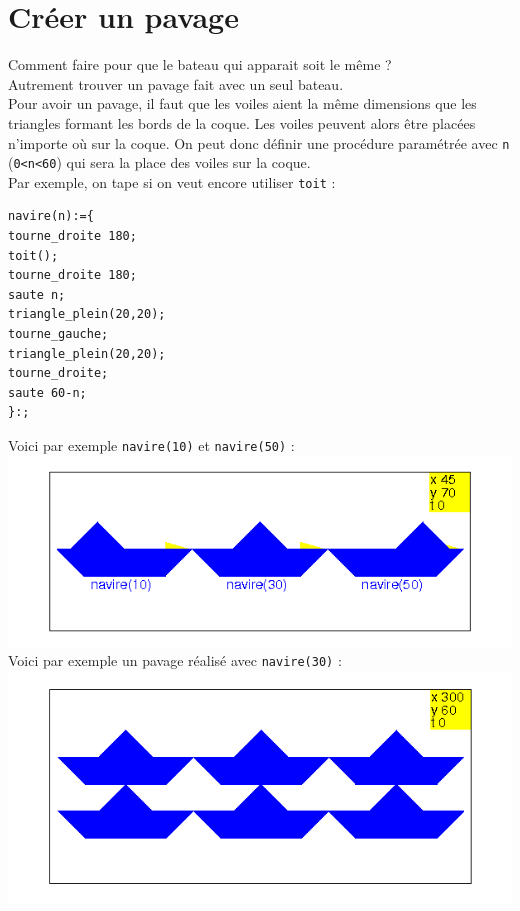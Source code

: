 \documentclass[a4paper,11pt]{book}
\begin{document}
\section{Cr\'eer un pavage}
Comment faire pour que le bateau qui apparait soit le m\^eme ?\\
Autrement trouver un pavage fait avec un seul bateau.\\
Pour avoir un pavage, il faut que les voiles aient la m\^eme 
dimensions que les triangles formant les bords de la coque. Les voiles peuvent 
alors \^etre plac\'ees n'importe o\`u sur la coque. 
On peut donc d\'efinir une proc\'edure param\'etr\'ee avec {\tt n} 
({\tt 0<n<60}) qui sera la place des voiles sur la coque.\\
Par exemple, on tape si on veut encore utiliser {\tt toit} :
\begin{verbatim} 
navire(n):={
tourne_droite 180;
toit();
tourne_droite 180;
saute n;
triangle_plein(20,20);
tourne_gauche;
triangle_plein(20,20);
tourne_droite;
saute 60-n;
}:;
\end{verbatim}
Voici par exemple {\tt navire(10)} et {\tt navire(50)} :\\
%
\includegraphics[width=\textwidth]{tortnavs}\\
Voici par exemple un pavage r\'ealis\'e avec {\tt navire(30)} :\\
%
\includegraphics[width=\textwidth]{tortnav}\\
\end{document}
